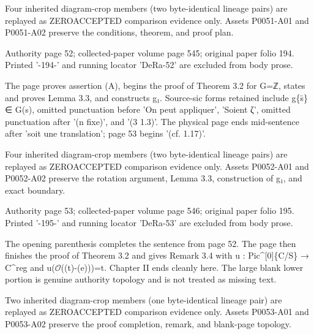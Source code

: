 \documentclass[11pt,a4paper]{article}
\begin{document}
Four inherited diagram-crop members (two byte-identical lineage pairs) are replayed as ZERO\textunderscore{}ACCEPTED comparison evidence only. Assets P0051-A01 and P0051-A02 preserve the conditions, theorem, and proof plan.


\par\medskip
\hypertarget{D018-P0052}{}
\par\smallskip
Authority page 52; collected-paper volume page 545; original paper folio 194. Printed '-194-' and running locator 'DeRa-52' are excluded from body prose.

The page proves assertion (A), begins the proof of Theorem 3.2 for G=ℤ, states and proves Lemma 3.3, and constructs g₁. Source-sic forms retained include g\textunderscore{}\{s̄\} ∈ G(s), omitted punctuation before 'On peut appliquer', 'Soient ζ', omitted punctuation after '(n fixe)', and '(3 1.3)'. The physical page ends mid-sentence after 'soit une translation'; page 53 begins '(cf. 1.17)'.

Four inherited diagram-crop members (two byte-identical lineage pairs) are replayed as ZERO\textunderscore{}ACCEPTED comparison evidence only. Assets P0052-A01 and P0052-A02 preserve the rotation argument, Lemma 3.3, construction of g₁, and exact boundary.


\par\medskip
\hypertarget{D018-P0053}{}
\par\smallskip
Authority page 53; collected-paper volume page 546; original paper folio 195. Printed '-195-' and running locator 'DeRa-53' are excluded from body prose.

The opening parenthesis completes the sentence from page 52. The page then finishes the proof of Theorem 3.2 and gives Remark 3.4 with u : Pic\textasciicircum{}[0]\textunderscore{}\{C/S\} → C\textasciicircum{}reg and u(\ensuremath{\mathcal{O}}((t)-(e)))=t. Chapter II ends cleanly here. The large blank lower portion is genuine authority topology and is not treated as missing text.

Two inherited diagram-crop members (one byte-identical lineage pair) are replayed as ZERO\textunderscore{}ACCEPTED comparison evidence only. Assets P0053-A01 and P0053-A02 preserve the proof completion, remark, and blank-page topology.
\end{document}

